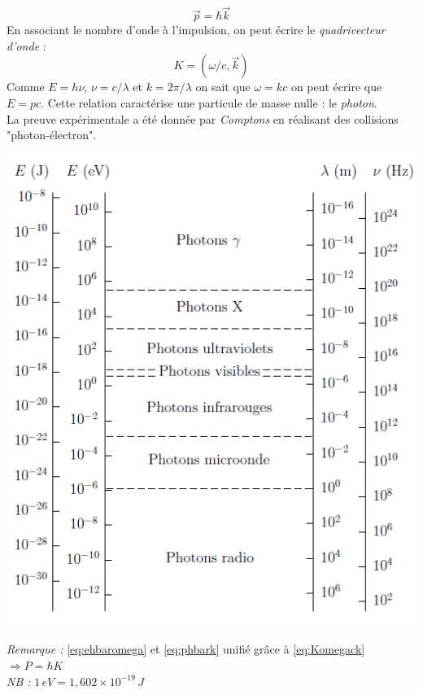 \documentclass	[11pt, a4paper, openany]{book}
\begin{document}
	\begin{equation}\label{eq:phbark}
		\vec{p} = \hbar \vec{k}
	\end{equation}
	En associant le nombre d'onde à l'impulsion, on peut écrire le \textit{quadrivecteur d'onde} :
	\begin{equation}\label{eq:Komegack}
		K = (\omega / c, \vec{k})
	\end{equation}
	Comme $E = h\nu$, $\nu = c/\lambda$ et $k = 2\pi/\lambda$ on sait que $\omega = kc$ on peut écrire que $E = pc$. Cette relation caractérise une particule de masse nulle : le \textit{photon}.\ \\
	La preuve expérimentale a été donnée par \textit{Comptons} en réalisant des collisions "photon-électron".\\
	
	\begin{center}
		\includegraphics[scale = 0.5]{img/tableaucoeur}
	\end{center}
	\textit{Remarque :} \eqref{eq:ehbaromega} et \eqref{eq:phbark} unifié grâce à \eqref{eq:Komegack}$\Rightarrow P=\hbar K$\\
	\textit{NB :} $1\,eV=1,602\times 10^{-19}\,J$
\end{document}
